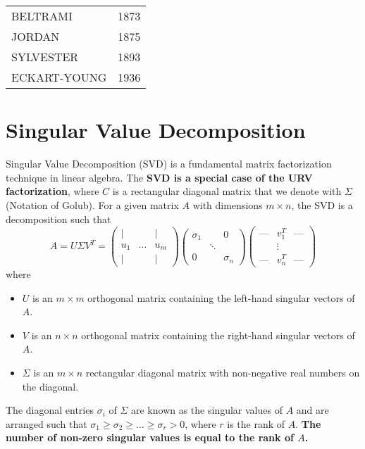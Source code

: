 \documentclass[a4paper, 12pt]{article}
\begin{document}
\begin{tabular}{l l}
BELTRAMI & 1873 \\
JORDAN & 1875 \\
SYLVESTER & 1893 \\
ECKART-YOUNG & 1936 \\
\end{tabular}

\section{Singular Value Decomposition}
Singular Value Decomposition (SVD) is a fundamental matrix factorization technique in linear algebra.
The \textbf{SVD is a special case of the URV factorization}, where $C$ is a rectangular diagonal matrix that we denote with $\Sigma$ (Notation of Golub).
For a given matrix $A$ with dimensions $m \times n$, the SVD is a decomposition such that
\[
A = U \Sigma V^T = 
\begin{pmatrix}
\vert & & \vert \\
u_1 & \dots & u_m \\
\vert & & \vert
\end{pmatrix}
\begin{pmatrix}
\sigma_1 & & 0 \\
& \ddots & \\
0 & & \sigma_n
\end{pmatrix}
\begin{pmatrix}
\text{---} & v_1^T & \text{---} \\
& \vdots & \\
\text{---} & v_n^T & \text{---}
\end{pmatrix}
\]
where
\begin{itemize}
    \item $U$ is an $m \times m$ orthogonal matrix containing the left-hand singular vectors of $A$.
    \item $V$ is an $n \times n$ orthogonal matrix containing the right-hand singular vectors of $A$.
    \item $\Sigma$ is an $m \times n$ rectangular diagonal matrix with non-negative real numbers on the diagonal.
\end{itemize}

The diagonal entries $\sigma_i$ of $\Sigma$ are known as the singular values of $A$
and are arranged such that $\sigma_1 \geq \sigma_2 \geq \dots \geq \sigma_r > 0$,
where $r$ is the rank of $A$. \newline
\textbf{The number of non-zero singular values is equal to the rank of $A$.}
\end{document}
